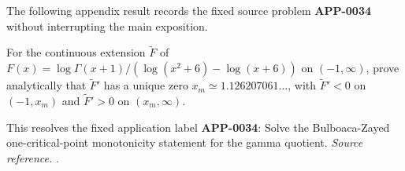 The following appendix result records the fixed source problem \textbf{APP-0034} without interrupting the main exposition.
\begin{corollary}
\label{res:bulboaca-zayed-gamma-quotient-full-monotonicity}
For the continuous extension \(\widetilde F\) of \(F(x)=\log\Gamma(x+1)/(\log(x^2+6)-\log(x+6))\) on \((-1,\infty)\), prove analytically that \(\widetilde F'\) has a unique zero \(x_m\simeq1.126207061\ldots\), with \(\widetilde F'<0\) on \((-1,x_m)\) and \(\widetilde F'>0\) on \((x_m,\infty)\).

This resolves the fixed application label \textbf{APP-0034}: Solve the Bulboaca-Zayed one-critical-point monotonicity statement for the gamma quotient.
\emph{Source reference.} \cite{app-app-0034-source}.
\end{corollary}
